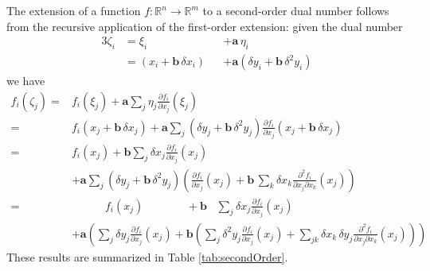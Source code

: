\documentclass[11pt]{article}
\begin{document}
The extension of a function $f: \mathbb{R}^{n} \rightarrow \mathbb{R}^{m}$ to
a second-order dual number follows from the recursive application of the
first-order extension: given the dual number
%
\begin{alignat*}{3}
\zeta_{i} 
&=
\xi_{i} 
&&+ \mathbf{a} \, \eta_{i}
\\
&=
\left( x_{i} + \mathbf{b} \, \delta x_{i} \right)
&&+ \mathbf{a} \left( \delta y_{i} + \mathbf{b} \, \delta^{2} y_{i} \right)
\end{alignat*}
%
we have
%
\begin{align*}
f_{i} \! \left( \zeta_{j} \right)
=&
f_{i} \! \left( \xi_{j} \right) 
+ \mathbf{a} \sum_{j} \eta_{j} \frac{ \partial f_{i} }{ \partial x_{j} } \! \left( \xi_{j} \right) 
\\
=&
f_{i} \! \left( x_{j} + \mathbf{b} \, \delta x_{j} \right) 
+ \mathbf{a} \sum_{j} \left( \delta y_{j} + \mathbf{b} \, \delta^{2} y_{j} \right)
\frac{ \partial f_{i} }{ \partial x_{j} } 
\! \left( x_{j} + \mathbf{b} \, \delta x_{j} \right) 
\\
=&
f_{i} \! \left( x_{j} \right) 
+ \mathbf{b} \sum_{j} \delta x_{j}  \frac{ \partial f_{i} }{ \partial x_{j} } \! \left( x_{j} \right)
\\
&+ 
\mathbf{a} \sum_{j} \left( \delta y_{j} + \mathbf{b} \, \delta^{2} y_{j} \right)
\left( \frac{ \partial f_{i} }{ \partial x_{j} } \! \left( x_{j} \right) + 
\mathbf{b} \, \sum_{k} \delta x_{k} 
\frac{ \partial^{2} f_{i} }{ \partial x_{j} \partial x_{k} } \! \left( x_{j} \right) \right) 
\\
=&
\quad\quad\quad 
f_{i} \! \left( x_{j} \right) 
\quad\quad\quad\;\;\;
+ \mathbf{b} \;\;\;
\sum_{j} \delta x_{j}  \frac{ \partial f_{i} }{ \partial x_{j} } \! \left( x_{j} \right)
\\
&+ 
\mathbf{a} \left( 
\sum_{j} \delta y_{j} \frac{ \partial f_{i} }{ \partial x_{j} } \! \left( x_{j} \right) 
+ \mathbf{b} \left(
\sum_{j} \delta^{2} y_{j} \frac{ \partial f_{i} }{ \partial x_{j} } \! \left( x_{j} \right)
+ \sum_{jk} \delta x_{k} \, \delta y_{j}
\frac{ \partial^{2} f_{i} }{ \partial x_{j} \partial x_{k} } \! \left( x_{j} \right)
\right)
\right)
\end{align*}
%
These results are summarized in Table \ref{tab:secondOrder}.
\end{document}
